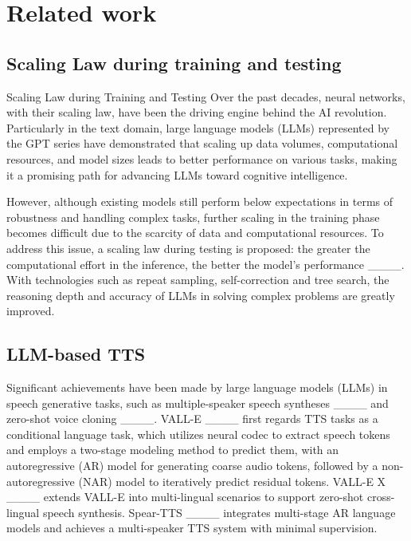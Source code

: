 \section{Related work}
\vspace{-5pt}
\subsection{Scaling Law during training and testing}
\vspace{-5pt}
Scaling Law during Training and Testing
Over the past decades, neural networks, with their scaling law, have been the driving engine behind the AI revolution. Particularly in the text domain, large language models (LLMs) represented by the GPT series have demonstrated that scaling up data volumes, computational resources, and model sizes leads to better performance on various tasks, making it a promising path for advancing LLMs toward cognitive intelligence.

However, although existing models still perform below expectations in terms of robustness and handling complex tasks, further scaling in the training phase becomes difficult due to the scarcity of data and computational resources. To address this issue, a scaling law during testing is proposed: the greater the computational effort in the inference, the better the model’s performance ____. With technologies such as repeat sampling, self-correction and tree search, the reasoning depth and accuracy of LLMs in solving complex problems are greatly improved.

\vspace{-10pt}
\subsection{LLM-based TTS}
\vspace{-5pt}
Significant achievements have been made by large language models (LLMs) in speech generative tasks, such as multiple-speaker speech syntheses ____ and zero-shot voice cloning ____. VALL-E ____ first regards TTS tasks as a conditional language task, which utilizes neural codec to extract speech tokens and employs a two-stage modeling method to predict them, with an autoregressive (AR) model for generating coarse audio tokens, followed by a non-autoregressive (NAR) model to iteratively predict residual tokens. VALL-E X ____ extends VALL-E into multi-lingual scenarios to support zero-shot cross-lingual speech synthesis. Spear-TTS ____ integrates multi-stage AR language models and achieves a multi-speaker TTS system with minimal supervision.

